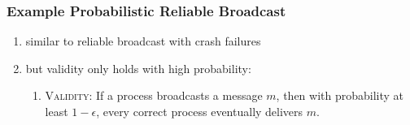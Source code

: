 \documentclass{article}
\begin{document}
\begin{adjustwidth}{2em}{2em}
\begin{adjustwidth}{2em}{2em}
			\subsubsection{Example Probabilistic Reliable Broadcast}
			\begin{adjustwidth}{2em}{}
				\begin{enumerate}[-]
					\item similar to reliable broadcast with crash failures
					\item but validity only holds with high probability:
					\begin{enumerate}[\textbullet]
						\item \textsc{Validity:} If a process broadcasts a message $m$, then with probability at least $1 -\epsilon$, every correct process eventually delivers $m$.
					\end{enumerate}
				\end{enumerate}
			\end{adjustwidth}

\end{adjustwidth}
\end{adjustwidth}
\end{document}

